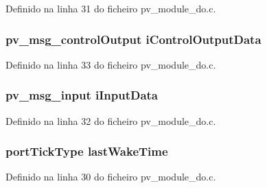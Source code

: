 Definido na linha 31 do ficheiro pv\-\_\-module\-\_\-do.\-c.

\hypertarget{group__app__do_gacabca53fbaffdbf13b8e5a1c29b73bc4}{
\subsubsection[{i\-Control\-Output\-Data}]{\setlength{\rightskip}{0pt plus 5cm}pv\-\_\-msg\-\_\-control\-Output i\-Control\-Output\-Data}}\label{group__app__do_gacabca53fbaffdbf13b8e5a1c29b73bc4}


Definido na linha 33 do ficheiro pv\-\_\-module\-\_\-do.\-c.

\hypertarget{group__app__do_gac40b8cfe5fd2000670ad57fe3e75ec89}{
\subsubsection[{i\-Input\-Data}]{\setlength{\rightskip}{0pt plus 5cm}pv\-\_\-msg\-\_\-input i\-Input\-Data}}\label{group__app__do_gac40b8cfe5fd2000670ad57fe3e75ec89}


Definido na linha 32 do ficheiro pv\-\_\-module\-\_\-do.\-c.

\hypertarget{group__app__do_gaa8db3871cb5f64abbd94ddd5a1db73a6}{
\subsubsection[{last\-Wake\-Time}]{\setlength{\rightskip}{0pt plus 5cm}port\-Tick\-Type last\-Wake\-Time}}\label{group__app__do_gaa8db3871cb5f64abbd94ddd5a1db73a6}


Definido na linha 30 do ficheiro pv\-\_\-module\-\_\-do.\-c.

